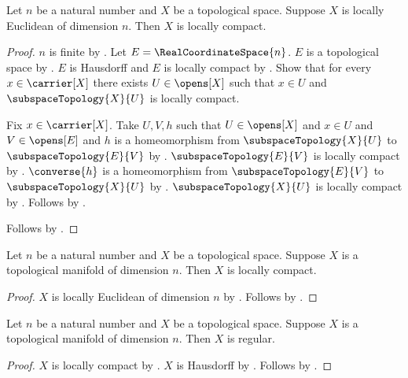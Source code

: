 \begin{theorem}\label{locally_euclidean_is_locally_compact}
    Let $n$ be a natural number and $X$ be a topological space.
    Suppose $X$ is locally Euclidean of dimension $n$.
    Then $X$ is locally compact.
\end{theorem}
\begin{proof}
    $n$ is finite by .
    Let $E=\RealCoordinateSpace{n}$.
    $E$ is a topological space by .
    $E$ is Hausdorff and $E$ is locally compact by
        .
    Show that for every $x\in\carrier[X]$ there exists $U\in\opens[X]$ such that
        $x\in U$ and $\subspaceTopology{X}{U}$ is locally compact.
    \begin{subproof}
        Fix $x\in\carrier[X]$.
        Take $U,V,h$ such that $U\in\opens[X]$ and $x\in U$ and
            $V\in\opens[E]$ and $h$ is a homeomorphism from
            $\subspaceTopology{X}{U}$ to $\subspaceTopology{E}{V}$ by
            .
        $\subspaceTopology{E}{V}$ is locally compact by
            .
        $\converse{h}$ is a homeomorphism from $\subspaceTopology{E}{V}$ to
            $\subspaceTopology{X}{U}$ by .
        $\subspaceTopology{X}{U}$ is locally compact by
            .
        Follows by \auto.
    \end{subproof}
    Follows by .
\end{proof}

\begin{theorem}\label{topological_manifold_is_locally_compact}
    Let $n$ be a natural number and $X$ be a topological space.
    Suppose $X$ is a topological manifold of dimension $n$.
    Then $X$ is locally compact.
\end{theorem}
\begin{proof}
    $X$ is locally Euclidean of dimension $n$ by .
    Follows by .
\end{proof}

\begin{theorem}\label{topological_manifold_is_regular}
    Let $n$ be a natural number and $X$ be a topological space.
    Suppose $X$ is a topological manifold of dimension $n$.
    Then $X$ is regular.
\end{theorem}
\begin{proof}
    $X$ is locally compact by .
    $X$ is Hausdorff by .
    Follows by .
\end{proof}
